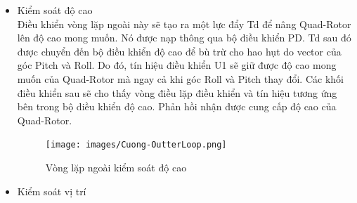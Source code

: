 {\begin{itemize}
\begin{figure}[h!]
\begin{center}
	        	\end{center}
        \end{figure}
			\\Vòng lập bên trong kiểm soát các góc Roll, Pitch và Yaw. Giả sử các trục x,y của Quad-Rotor đối xứng, tức là điều khiển góc Pitch và Roll giống nhau. Góc Pitch giảm khi di chuyển Quad-Rotor về phía trước dọc theo trục X trong khi góc Roll thì di chuyển Quad-Rotor về bên hông.
ROLL: Tín hiệu điều khiển U2 được tạo ra từ roller hoặc được truyền vào thông qua bộ điều khiển PD. Tín hiệu này sẽ điều chỉnh góc Roll của Quad-Rotor.
PITCH: Tín hiệu điều khiển U3 được tạo ra từ pitcher hoặc được truyền vào thông qua bộ điều khiển aPD. Tín hiệu này sẽ điều chỉnh độ cao của Quad-Rotor. Như đã nói ở trên giá trị của P và D của góc Roll và Pitch là như nhau.
YAW: Tín hiệu điều khiển U4 được tạo ra từ yawer hoặc được truyền vào thông qua bộ điều khiển PD. Tín hiệu này sẽ điều khiển góc YAW của Quad-Rotor. Giá trị của các góc Pitch, Roll, Yaw được đo sẽ là giá trị được nạp từ output của mẫu thử.
\\
			\item Kiểm soát độ cao
			\\
			Điều khiển vòng lặp ngoài này sẽ tạo ra một lực đẩy Td để nâng Quad-Rotor lên độ cao mong muốn. Nó được nạp thông qua bộ điều khiển PD. Td sau đó được chuyển đến bộ điều khiển độ cao để bù trừ cho hao hụt do vector của góc Pitch và Roll. Do đó, tín hiệu điều khiển U1 sẽ giữ được độ cao mong muốn của Quad-Rotor mà ngay cả khi góc Roll và Pitch thay đổi. Các khối điều khiển sau sẽ cho thấy vòng điều lặp điều khiển và tín hiệu tương ứng bên trong bộ điều khiển độ cao. Phản hồi nhận được cung cấp độ cao của Quad-Rotor.
\\
\begin{figure}[h!]
	        	\begin{center}
	        		\texttt{[image: images/Cuong-OutterLoop.png]}
	        		\caption{Vòng lặp ngoài kiểm soát độ cao}
	        	\end{center}
        \end{figure}
			\item Kiểm soát vị trí
			\\
			

\end{itemize}}
